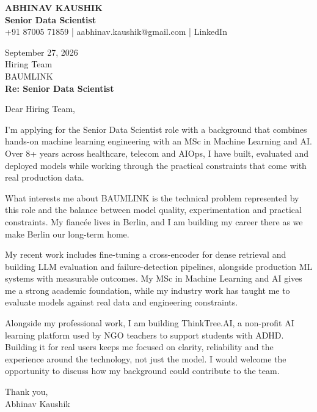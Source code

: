 \documentclass[10pt,a4paper]{article}
\begin{document}
\begin{center}
{\Large\bfseries ABHINAV KAUSHIK}\\[2pt]
{\bfseries Senior Data Scientist}\\[2pt]
+91 87005 71859 \quad | \quad aabhinav.kaushik@gmail.com \quad | \quad LinkedIn
\end{center}
\vspace{8pt}
September 27, 2026\\[6pt]
Hiring Team\\
BAUMLINK\\[4pt]
\textbf{Re: Senior Data Scientist}

Dear Hiring Team,

I’m applying for the Senior Data Scientist role with a background that combines hands-on machine learning engineering with an MSc in Machine Learning and AI. Over 8+ years across healthcare, telecom and AIOps, I have built, evaluated and deployed models while working through the practical constraints that come with real production data.

What interests me about BAUMLINK is the technical problem represented by this role and the balance between model quality, experimentation and practical constraints. My fiancée lives in Berlin, and I am building my career there as we make Berlin our long-term home.

My recent work includes fine-tuning a cross-encoder for dense retrieval and building LLM evaluation and failure-detection pipelines, alongside production ML systems with measurable outcomes. My MSc in Machine Learning and AI gives me a strong academic foundation, while my industry work has taught me to evaluate models against real data and engineering constraints.

Alongside my professional work, I am building ThinkTree.AI, a non-profit AI learning platform used by NGO teachers to support students with ADHD. Building it for real users keeps me focused on clarity, reliability and the experience around the technology, not just the model. I would welcome the opportunity to discuss how my background could contribute to the team.

Thank you,\\
Abhinav Kaushik
\end{document}
